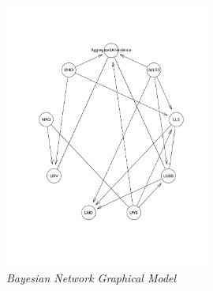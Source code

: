\documentclass[inte,nonblindrev]{informs3} %
\begin{document}
\begin{figure}[!ht]
\centering\includegraphics[height = 0.5\textheight, width = 0.6\textwidth]{Figure6.pdf}
\caption{\textit{Bayesian Network Graphical Model}}\label{Bayes}
\end{figure}

%
%
%




\end{document}
